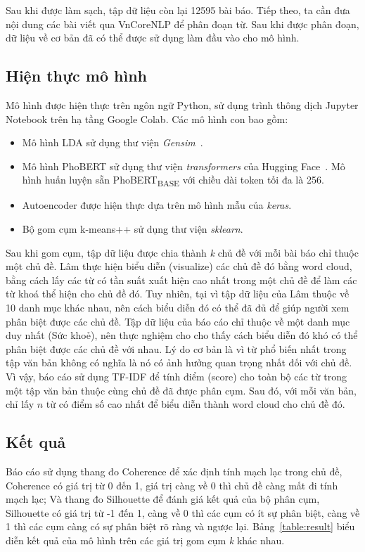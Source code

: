 Sau khi được làm sạch, tập dữ liệu còn lại 12595 bài báo. Tiếp theo, ta cần đưa
nội dung các bài viết qua VnCoreNLP để phân đoạn từ. Sau khi được phân đoạn, dữ
liệu về cơ bản đã có thể được sử dụng làm đầu vào cho mô hình.

\subsection{Hiện thực mô hình}
Mô hình được hiện thực trên ngôn ngữ Python, sử dụng trình thông dịch Jupyter
Notebook trên hạ tầng Google Colab. Các mô hình con bao gồm:

\begin{itemize}
    \item Mô hình LDA sử dụng thư viện
        \textit{Gensim}~\cite{GensimTopicModelling2021}.
    \item Mô hình PhoBERT sử dụng thư viện \textit{transformers} của Hugging
        Face~\cite{wolfTransformersStateoftheArtNatural2020}. Mô hình huấn
        luyện sẵn PhoBERT\textsubscript{BASE} với chiều dài token tối đa là
        256.
    \item Autoencoder được hiện thực dựa trên mô hình mẫu của \textit{keras}.
    \item Bộ gom cụm k-means++ sử dụng thư viện \textit{sklearn}.
\end{itemize}

Sau khi gom cụm, tập dữ liệu được chia thành \textit{k} chủ đề với mỗi bài báo
chỉ thuộc một chủ đề. Lâm \cite{lamGomCumVan2021} thực hiện biểu diễn
(visualize) các chủ đề đó bằng word cloud, bằng cách lấy các từ có tần suất
xuất hiện cao nhất trong một chủ đề để làm các từ khoá thể hiện cho chủ đề đó.
Tuy nhiên, tại vì tập dữ liệu của Lâm \cite{lamGomCumVan2021} thuộc về 10 danh
mục khác nhau, nên cách biểu diễn đó có thể đã đủ để giúp người xem phân biệt
được các chủ đề. Tập dữ liệu của báo cáo chỉ thuộc về một danh mục duy nhất
(Sức khoẻ), nên thực nghiệm cho cho thấy cách biểu diễn đó khó có thể phân biệt
được các chủ đề với nhau. Lý do cơ bản là vì từ phổ biến nhất trong tập văn bản
không có nghĩa là nó có ảnh hưởng quan trọng nhất đối với chủ đề. Vì vậy, báo
cáo sử dụng TF-IDF để tính điểm (score) cho toàn bộ các từ trong một tập văn
bản thuộc cùng chủ đề đã được phân cụm. Sau đó, với mỗi văn bản, chỉ lấy $n$ từ
có điểm số cao nhất để biểu diễn thành word cloud cho chủ đề đó.

\subsection{Kết quả}
Báo cáo sử dụng thang đo Coherence để xác định tính mạch lạc trong chủ đề,
Coherence có giá trị từ 0 đến 1, giá trị càng về 0 thì chủ đề càng mất đi tính
mạch lạc; Và thang đo Silhouette để đánh giá kết quả của bộ phân cụm,
Silhouette có giá trị từ -1 đến 1, càng về 0 thì các cụm có ít sự phân biệt,
càng về 1 thì các cụm càng có sự phân biệt rõ ràng và ngược lại.
Bảng~\ref{table:result} biểu diễn kết quả của mô hình trên các giá trị gom cụm
\textit{k} khác nhau.

